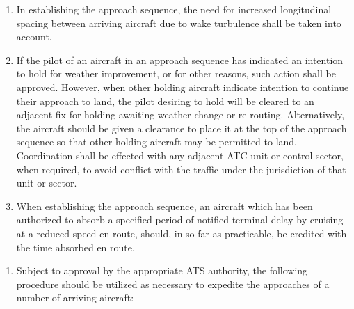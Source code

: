 \begin{enumeratesc}
\begin{enumerate}
        \item In establishing the approach sequence, the need for increased longitudinal spacing between arriving aircraft due to wake turbulence shall be taken into account.
        \item If the pilot of an aircraft in an approach sequence has indicated an intention to hold for weather improvement, or for other reasons, such action shall be approved. However, when other holding aircraft indicate intention to continue their approach to land, the pilot desiring to hold will be cleared to an adjacent fix for holding awaiting weather change or re-routing. Alternatively, the aircraft should be given a clearance to place it at the top of the approach sequence so that other holding aircraft may be permitted to land. Coordination shall be effected with any adjacent ATC unit or control sector, when required, to avoid conflict with the traffic under the jurisdiction of that unit or sector.
        \item When establishing the approach sequence, an aircraft which has been authorized to absorb a specified period of notified terminal delay by cruising at a reduced speed en route, should, in so far as practicable, be credited with the time absorbed en route.
    \end{enumerate}

    \begin{enumerate}[labelindent=0pt,itemsep=0.2cm]
         \label{6.5.6.2.1}
        \begin{enumerate}
            \item Subject to approval by the appropriate ATS authority, the following procedure should be utilized as necessary to expedite the approaches of a number of arriving aircraft:



\end{enumerate}
\end{enumerate}
\end{enumeratesc}
